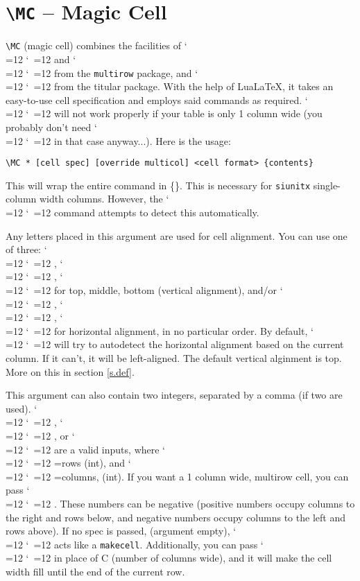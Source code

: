 \documentclass[11pt,parskip=half]{scrartcl}
\newcommand{\llcmd}[1]{\leavevmode\llap{\texttt{\detokenize{#1}\ }}}
\def\cmd{\bgroup\catcode`\\=12 \catcode`\ =12 \cmdA}
\def\cmdA#1{\egroup{\texttt{\detokenize{#1}}}}
\begin{document}
\section{\texttt{\textbackslash MC} -- Magic Cell}
\texttt{\textbackslash MC} (magic cell) combines the facilities of
\cmd{\multirow} and \cmd{\multicolumn} from the \texttt{multirow} package, and \cmd{\makcell} from the titular package.
With the help of LuaLaTeX, it takes an easy-to-use cell specification and employs said commands as required.
\cmd{\MC} will not work properly if your table is only 1 column wide (you probably don't need \cmd{MC} in that case anyway...).
Here is the usage:

\texttt{\textbackslash MC * [cell spec] [override multicol] <cell format>   \{contents\} }

\llcmd{*}This will wrap the entire command in \{\}. This is necessary for \texttt{siunitx} single-column width columns.
However, the \cmd{\MC} command attempts to detect this automatically.

\llcmd{[cell spec]}%
Any letters placed in this argument are used for cell alignment.
You can use one of three: \cmd{t}, \cmd{m}, \cmd{b} for top, middle, bottom (vertical alignment),
and/or \cmd{l}, \cmd{c}, \cmd{r} for horizontal alignment, in no particular order.
By default, \cmd{\MC}   will try to autodetect the horizontal alignment based on the current column.
If it can't, it will be left-aligned.
The default vertical alginment is top. More on this in section \ref{s.def}.

This argument can also contain two integers, separated by a comma (if two are used).
\cmd{C,R}, \cmd{C}, or \cmd{,R} are a valid inputs,
where \cmd{R}=rows (int), and \cmd{C}=columns, (int).
If you want a 1 column wide, multirow cell,
you can pass \cmd{,R}. These numbers can be negative (positive numbers occupy columns to the right
and rows below, and negative numbers occupy columns to the left and rows above).
If no spec is passed, (argument empty), \cmd{\MC}
acts like a \texttt{makecell}.
Additionally, you can pass \cmd{+} in place of C (number of columns wide),
and it will make the cell width fill until the end of the current row.
\end{document}
